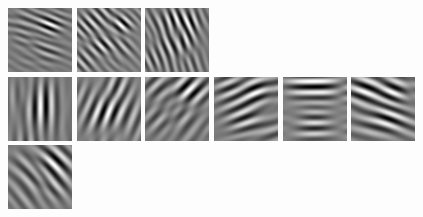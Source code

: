 \begin{figure}
\begin{center}
  \includegraphics[scale=0.5]{ch4/figures/real_2_5.jpg}
  \includegraphics[scale=0.5]{ch4/figures/real_2_6.jpg}
  \includegraphics[scale=0.5]{ch4/figures/real_2_7.jpg}\\
  \includegraphics[scale=0.5]{ch4/figures/real_3_0.jpg}
  \includegraphics[scale=0.5]{ch4/figures/real_3_1.jpg}
  \includegraphics[scale=0.5]{ch4/figures/real_3_2.jpg}
  \includegraphics[scale=0.5]{ch4/figures/real_3_3.jpg}
  \includegraphics[scale=0.5]{ch4/figures/real_3_4.jpg}
  \includegraphics[scale=0.5]{ch4/figures/real_3_5.jpg}
  \includegraphics[scale=0.5]{ch4/figures/real_3_6.jpg}

\end{center}
\end{figure}
